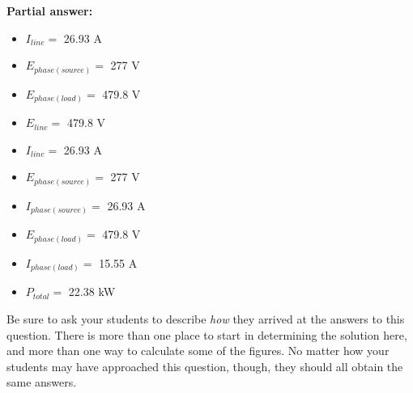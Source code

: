 





\noindent
{\bf Partial answer:}

\begin{itemize}
\item{} $I_{line} =$ 26.93 A
\item{} $E_{phase(source)} =$ 277 V
\item{} $E_{phase(load)} =$ 479.8 V
\end{itemize}







\begin{itemize}
\item{} $E_{line} =$ 479.8 V
\item{} $I_{line} =$ 26.93 A
\item{} $E_{phase(source)} =$ 277 V
\item{} $I_{phase(source)} =$ 26.93 A
\item{} $E_{phase(load)} =$ 479.8 V
\item{} $I_{phase(load)} =$ 15.55 A
\item{} $P_{total} =$ 22.38 kW
\end{itemize}

\vskip 10pt

Be sure to ask your students to describe {\it how} they arrived at the answers to this question.  There is more than one place to start in determining the solution here, and more than one way to calculate some of the figures.  No matter how your students may have approached this question, though, they should all obtain the same answers.





